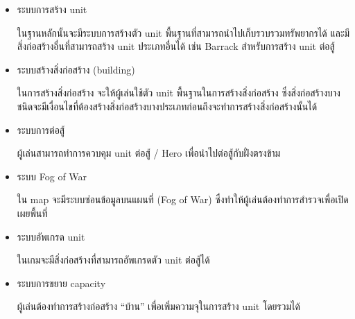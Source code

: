 \begin{itemize}
  \item ระบบการสร้าง unit
  
  \qquad ในฐานหลักนั้นจะมีระบบการสร้างตัว unit พื้นฐานที่สามารถนําไปเก็บรวบรวมทรัพยากรได้ 
  และมีสิ่งก่อสร้างอื่นที่สามารถสร้าง unit ประเภทอื่นได้ เช่น Barrack สำหรับการสร้าง unit ต่อสู้
  \item ระบบสร้างสิ่งก่อสร้าง (building)
  
  \qquad ในการสร้างสิ่งก่อสร้าง จะให้ผู้เล่นใช้ตัว unit พื้นฐานในการสร้างสิ่งก่อสร้าง ซึ่งสิ่งก่อสร้างบางชนิดจะมีเงื่อนไขที่ต้องสร้างสิ่งก่อสร้างบางประเภทก่อนถึงจะทําการสร้างสิ่งก่อสร้างนั้นได้
  \item ระบบการต่อสู้
  
  \qquad ผู้เล่นสามารถทําการควบคุม unit ต่อสู้ / Hero เพื่อนําไปต่อสู้กับฝั่งตรงข้าม
  \item ระบบ Fog of War
  
  \qquad ใน map จะมีระบบซ่อนข้อมูลบนแผนที่ (Fog of War) ซึ่งทําให้ผู้เล่นต้องทําการสํารวจเพื่อเปิดเผยพื้นที่
  \item ระบบอัพเกรด unit
  
  \qquad ในเกมจะมีสิ่งก่อสร้างที่สามารถอัพเกรดตัว unit ต่อสู้ได้
  \item ระบบการขยาย capacity
  
  \qquad ผู้เล่นต้องทําการสร้างก่อสร้าง “บ้าน” เพื่อเพิ่มความจุในการสร้าง unit โดยรวมได้
\end{itemize}